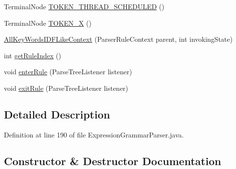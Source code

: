 \begin{DoxyCompactItemize}
Terminal\+Node \hyperlink{classgov_1_1nasa_1_1jpf_1_1inspector_1_1server_1_1expression_1_1parser_1_1_expression_grammar_pad664d42a2aee14226e172b869b9ffb3b_aef7157bba5be58e7c45fe0618a63525a}{T\+O\+K\+E\+N\+\_\+\+T\+H\+R\+E\+A\+D\+\_\+\+S\+C\+H\+E\+D\+U\+L\+ED} ()
\item 
Terminal\+Node \hyperlink{classgov_1_1nasa_1_1jpf_1_1inspector_1_1server_1_1expression_1_1parser_1_1_expression_grammar_pad664d42a2aee14226e172b869b9ffb3b_a7ab36bf9409a688c674c6d9a4ff9c336}{T\+O\+K\+E\+N\+\_\+X} ()
\item 
\hyperlink{classgov_1_1nasa_1_1jpf_1_1inspector_1_1server_1_1expression_1_1parser_1_1_expression_grammar_pad664d42a2aee14226e172b869b9ffb3b_ac9911e52bfc6aacdd30fdc37ca588409}{All\+Key\+Words\+I\+D\+F\+Like\+Context} (Parser\+Rule\+Context parent, int invoking\+State)
\item 
int \hyperlink{classgov_1_1nasa_1_1jpf_1_1inspector_1_1server_1_1expression_1_1parser_1_1_expression_grammar_pad664d42a2aee14226e172b869b9ffb3b_a749f453f24e65ec6f4c49fc23ce228c3}{get\+Rule\+Index} ()
\item 
void \hyperlink{classgov_1_1nasa_1_1jpf_1_1inspector_1_1server_1_1expression_1_1parser_1_1_expression_grammar_pad664d42a2aee14226e172b869b9ffb3b_a7a22dfd5ca58483ec3ba1be50ad6fbc9}{enter\+Rule} (Parse\+Tree\+Listener listener)
\item 
void \hyperlink{classgov_1_1nasa_1_1jpf_1_1inspector_1_1server_1_1expression_1_1parser_1_1_expression_grammar_pad664d42a2aee14226e172b869b9ffb3b_a72bb5bcced38197128863f3a0649d870}{exit\+Rule} (Parse\+Tree\+Listener listener)
\end{DoxyCompactItemize}


\subsection{Detailed Description}


Definition at line 190 of file Expression\+Grammar\+Parser.\+java.



\subsection{Constructor \& Destructor Documentation}
